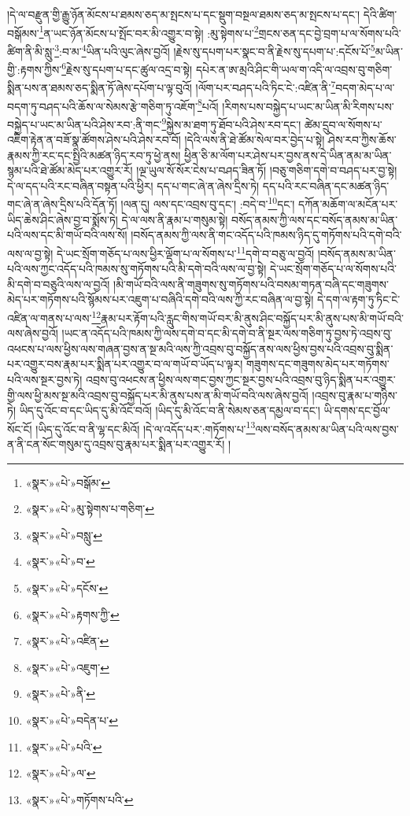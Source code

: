 །དེ་ལ་བརྫུན་གྱི་རྒྱུ་ཉོན་མོངས་པ་ཐམས་ཅད་མ་སྤངས་པ་དང་སྡུག་བསྔལ་ཐམས་ཅད་མ་སྤངས་པ་དང་། དེའི་ཚིག་བསྒོམས་\footnote{«སྣར་»«པེ་»བསྒོམ་}ན་ཡང་ཉོན་མོངས་པ་སྤོང་བར་མི་འགྱུར་བ་སྟེ། :མུ་སྟེགས་པ་\footnote{«སྣར་»«པེ་»མུ་སྟེགས་པ་གཅིག་}གྲངས་ཅན་དང་བྱེ་བྲག་པ་ལ་སོགས་པའི་ཚིག་ནི་མི་སླུ་\footnote{«སྣར་»«པེ་»བསླུ་}:བ་མ་\footnote{«སྣར་»«པེ་»བ་}ཡིན་པའི་ལུང་ཞེས་བྱའོ། །རྗེས་སུ་དཔག་པར་སྣང་བ་ནི་རྗེས་སུ་དཔག་པ་:དངོས་པོ་\footnote{«སྣར་»«པེ་»དངོས་}མ་ཡིན་གྱི་:རྟགས་ཀྱིས་\footnote{«སྣར་»«པེ་»རྟགས་ཀྱི་}རྗེས་སུ་དཔག་པ་དང་ཚུལ་འདྲ་བ་སྟེ། དཔེར་ན་ཨ་མྲའི་ཤིང་གི་ཡལ་ག་འདི་ལ་འབྲས་བུ་གཅིག་སྨིན་པས་ན་ཐམས་ཅད་སྨིན་ཏོ་ཞེས་དཔོག་པ་ལྟ་བུའོ། །ལོག་པར་བཤད་པའི་ཏིང་ངེ་:འཛིན་ནི་\footnote{«སྣར་»«པེ་»འཛིན་}བདག་མེད་པ་ལ་བདག་ཏུ་བཤད་པའི་ཆོས་ལ་སེམས་རྩེ་གཅིག་ཏུ་འཇོག་\footnote{«སྣར་»«པེ་»འཇུག་}པའོ། །རིགས་པས་བསྐྱེད་པ་ཡང་མ་ཡིན་མི་རིགས་པས་བསྐྱེད་པ་ཡང་མ་ཡིན་པའི་ཤེས་རབ་:ནི་གང་\footnote{«སྣར་»«པེ་»ནི་}སྐྱེས་མ་ཐག་ཏུ་ཐོབ་པའི་ཤེས་རབ་དང་། ཚེམ་དྲུབ་ལ་སོགས་པ་འཇིག་རྟེན་ན་བཟོ་སྣ་ཚོགས་ཤེས་པའི་ཤེས་རབ་བོ། །དེའི་ལས་ནི་ཐེ་ཚོམ་སེལ་བར་བྱེད་པ་སྟེ། ཤེས་རབ་ཀྱིས་ཆོས་རྣམས་ཀྱི་རང་དང་སྤྱིའི་མཚན་ཉིད་རབ་ཏུ་ཕྱེ་ནས། ཕྱིན་ཅི་མ་ལོག་པར་ཤེས་པར་བྱས་ནས་དེ་ཡིན་ནམ་མ་ཡིན་སྙམ་པའི་ཐེ་ཚོམ་མེད་པར་འགྱུར་རོ། །ལྔ་ཡུལ་སོ་སོར་ངེས་པ་བཤད་ཟིན་ཏོ། །བཅུ་གཅིག་དགེ་བ་བཤད་པར་བྱ་སྟེ། དེ་ལ་དད་པའི་རང་བཞིན་བསྟན་པའི་ཕྱིར། དད་པ་གང་ཞེ་ན་ཞེས་དྲིས་ཏེ། དད་པའི་རང་བཞིན་དང་མཚན་ཉིད་གང་ཞེ་ན་ཞེས་དྲིས་པའི་དོན་ཏོ། །ལན་དུ། ལས་དང་འབྲས་བུ་དང་། :བདེ་བ་\footnote{«སྣར་»«པེ་»བདེན་པ་}དང་། དཀོན་མཆོག་ལ་མངོན་པར་ཡིད་ཆེས་ཤིང་ཞེས་བྱ་བ་སྨོས་ཏེ། དེ་ལ་ལས་ནི་རྣམ་པ་གསུམ་སྟེ། བསོད་ནམས་ཀྱི་ལས་དང་བསོད་ནམས་མ་ཡིན་པའི་ལས་དང་མི་གཡོ་བའི་ལས་སོ། །བསོད་ནམས་ཀྱི་ལས་ནི་གང་འདོད་པའི་ཁམས་ཉིད་དུ་གཏོགས་པའི་དགེ་བའི་ལས་ལ་བྱ་སྟེ། དེ་ཡང་སྲོག་གཅོད་པ་ལས་ཕྱིར་ལྡོག་པ་ལ་སོགས་པ་\footnote{«སྣར་»«པེ་»པའི་}དགེ་བ་བཅུ་ལ་བྱའོ། །བསོད་ནམས་མ་ཡིན་པའི་ལས་ཀྱང་འདོད་པའི་ཁམས་སུ་གཏོགས་པའི་མི་དགེ་བའི་ལས་ལ་བྱ་སྟེ། དེ་ཡང་སྲོག་གཅོད་པ་ལ་སོགས་པའི་མི་དགེ་བ་བཅུའི་ལས་ལ་བྱའོ། །མི་གཡོ་བའི་ལས་ནི་གཟུགས་སུ་གཏོགས་པའི་བསམ་གཏན་བཞི་དང་གཟུགས་མེད་པར་གཏོགས་པའི་སྙོམས་པར་འཇུག་པ་བཞིའི་དགེ་བའི་ལས་ཀྱི་རང་བཞིན་ལ་བྱ་སྟེ། དེ་དག་ལ་རྟག་ཏུ་ཏིང་ངེ་འཛིན་ལ་གནས་པ་ལས་\footnote{«སྣར་»«པེ་»ལ་}རྣམ་པར་རྟོག་པའི་རླུང་གིས་གཡོ་བར་མི་ནུས་ཤིང་བསྐྱོད་པར་མི་ནུས་པས་མི་གཡོ་བའི་ལས་ཞེས་བྱའོ། །ཡང་ན་འདོད་པའི་ཁམས་ཀྱི་ལས་དགེ་བ་དང་མི་དགེ་བ་ནི་སྔར་ལས་གཅིག་ཏུ་བྱས་ཏེ་འབྲས་བུ་འཕངས་པ་ལས་ཕྱིས་ལས་གཞན་བྱས་ན་སྔ་མའི་ལས་ཀྱི་འབྲས་བུ་བསྐྱོད་ནས་ལས་ཕྱིས་བྱས་པའི་འབྲས་བུ་སྨིན་པར་འགྱུར་བས་རྣམ་པར་སྨིན་པར་འགྱུར་བ་ལ་གཡོ་བ་ཡོད་པ་ལྟར། གཟུགས་དང་གཟུགས་མེད་པར་གཏོགས་པའི་ལས་སྔར་བྱས་ཏེ། འབྲས་བུ་འཕངས་ན་ཕྱིས་ལས་གང་བྱས་ཀྱང་སྔར་བྱས་པའི་འབྲས་བུ་ཉིད་སྨིན་པར་འགྱུར་གྱི་ལས་ཕྱི་མས་སྔ་མའི་འབྲས་བུ་བསྐྱོད་པར་མི་ནུས་པས་ན་མི་གཡོ་བའི་ལས་ཞེས་བྱའོ། །འབྲས་བུ་རྣམ་པ་གཉིས་ཏེ། ཡིད་དུ་འོང་བ་དང་ཡིད་དུ་མི་འོང་བའོ། །ཡིད་དུ་མི་འོང་བ་ནི་སེམས་ཅན་དམྱལ་བ་དང་། ཡི་དགས་དང་བྱོལ་སོང་ངོ། །ཡིད་དུ་འོང་བ་ནི་ལྷ་དང་མིའོ། །དེ་ལ་འདོད་པར་:གཏོགས་པ་\footnote{«སྣར་»«པེ་»གཏོགས་པའི་}ལས་བསོད་ནམས་མ་ཡིན་པའི་ལས་བྱས་ན་ནི་ངན་སོང་གསུམ་དུ་འབྲས་བུ་རྣམ་པར་སྨིན་པར་འགྱུར་རོ། །
